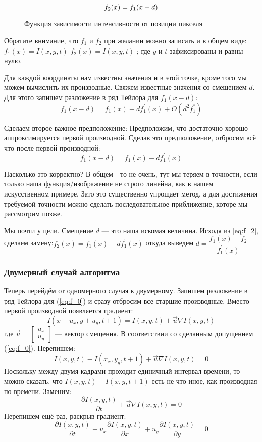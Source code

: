 \begin{equation}
\numberwithin{equation}{section}
\label{eq:f_2}
f_2(x)=f_1(x-d)
\end{equation}
\begin{figure}[ht]
\caption{Функция зависимости интенсивности от позиции пикселя}
\label{pic:math_2}
\end{figure}

Обратите внимание, что $f_1$ и $f_2$ при желании можно записать и в общем виде: $f_1(x)=I(x,y,t)$ $f_2(x)=I(x,y,t)$ ; где $y$ и $t$ зафиксированы и равны нулю.

Для каждой координаты нам известны значения и в этой точке, кроме того мы можем вычислить их производные. Свяжем известные значения со смещением $d$. Для этого запишем разложение в ряд Тейлора для $f_1(x-d)$:
$$f_1(x-d)=f_1(x)-df^{'}_1(x)+O(d^2f^{''}_1)$$

Сделаем второе важное предположение: Предположим, что достаточно хорошо аппроксимируется первой производной. Сделав это предположение, отбросим всё что после первой производной:
$$f_1(x-d)=f_1(x)-df_1^{'}(x)$$

Насколько это корректно? В общем—то не очень, тут мы теряем в точности, если только наша функция/изображение не строго линейна, как в нашем искусственном примере. Зато это существенно упрощает метод, а для достижения требуемой точности можно сделать последовательное приближение, которе мы рассмотрим позже.

Мы почти у цели. Смещение $d$ — это наша искомая величина. Исходя из \ref{eq:f_2}, сделаем замену:$f_2(x)=f_1(x)-df_1^{'}(x)$
откуда выведем $d = \dfrac{f_1(x)-f_2}{f_1^{'}(x)}$
\subsubsection{Двумерный случай алгоритма}

Теперь перейдём от одномерного случая к двумерному. Запишем разложение в ряд Тейлора для (\ref{eq:f_0}) и сразу отбросим все старшие производные. Вместо первой производной появляется градиент:
$$I(x+u_x,y+u_y,t+1)=I(x,y,t)+\overrightarrow{u} \nabla I(x,y,t)$$
где $\overrightarrow{u} = \begin{bmatrix}
u_x\\
u_y
\end{bmatrix} $ — вектор смещения.
В соответствии со сделанным допущением (\ref{eq:f_0}). Перепишем:
$$I(x,y,t)-I(x_x,y_y,t+1) + \overrightarrow{u} \nabla I(x,y,t) = 0$$
Поскольку между двумя кадрами проходит единичный интервал времени, то можно сказать, что $I(x,y,t)-I(x,y,t+1)$ есть не что иное, как производная по времени.
Заменим:
$$\frac{\partial I(x,y,t)}{\partial t} + \overrightarrow{u} \nabla I(x,y,t) = 0$$
Перепишем ещё раз, раскрыв градиент:
$$\frac{\partial I(x,y,t)}{\partial t} + u_x\frac{\partial I(x,y,t)}{\partial x} + u_y\frac{\partial I(x,y,t)}{\partial y} = 0$$

